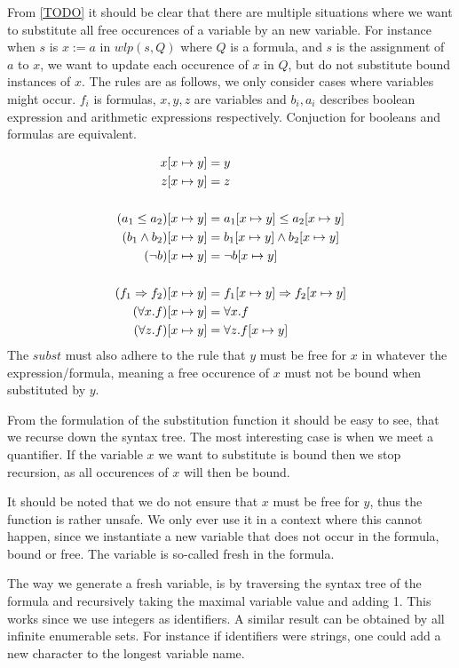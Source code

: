 From \autoref{TODO} it should be clear that there are multiple situations where we want to substitute
all free occurences of a variable by an new variable.
For instance when $s$ is $x := a$ in $wlp(s, Q)$ where $Q$ is a formula, and $s$ is the assignment of $a$ to $x$,
we want to update each occurence of $x$ in $Q$, but do not substitute bound instances of $x$.
The rules are as follows, we only consider cases where variables might occur. $f_{i}$ is formulas, $x,y,z$ are variables and $b_{i}, a_{i}$ describes boolean expression and arithmetic expressions respectively. Conjuction for booleans and formulas are equivalent.

\begin{align*}
x[x \mapsto y] &= y \\
z[x \mapsto y] &= z \\
&\\
(a_{1} \leq a_{2})[x \mapsto y] &= a_{1}[x \mapsto y] \le a_{2}[x \mapsto y] \\
(b_{1} \wedge b_{2})[x \mapsto y] &= b_{1}[x \mapsto y] \wedge b_{2}[x \mapsto y] \\
(\neg b)[x \mapsto y] &= \neg b[x \mapsto y] \\
&\\
(f_{1} \Rightarrow f_{2})[x \mapsto y] &= f_{1}[x \mapsto y] \Rightarrow f_{2}[x \mapsto y] \\
(\forall x. f)[x \mapsto y] &=  \forall x. f\\
(\forall z. f)[x \mapsto y] &=  \forall z. f[x \mapsto y]\\
\end{align*}
The $subst$ must also adhere to the rule that $y$ must be free for $x$ in whatever the expression/formula,
meaning a free occurence of $x$ must not be bound when substituted by $y$.

From the formulation of the substitution function it should be easy to see, that we recurse down the syntax tree.
The most interesting case is when we meet a quantifier. If the variable $x$ we want to substitute is bound then we stop recursion, as all occurences of $x$ will then be bound.

It should be noted that we do not ensure that $x$ must be free for $y$,
thus the function is rather unsafe.
We only ever use it in a context where this cannot happen, since we instantiate a new variable that does not occur in the formula, bound or free. The variable is so-called fresh in the formula.

The way we generate a fresh variable, is by traversing the syntax tree of the formula and recursively taking the maximal variable value and adding 1.
This works since we use integers as identifiers.
A similar result can be obtained by all infinite enumerable sets. For instance if identifiers were strings, one could add a new character to the longest variable name.

